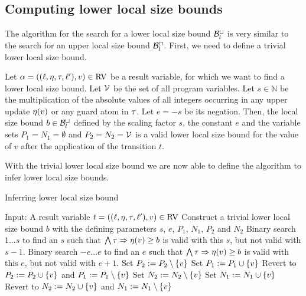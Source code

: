\subsection{Computing lower local size bounds}

The algorithm for the search for a lower local size bound $\mathcal{B}^\sqcup_l$ is very similar to the search for an upper local size bound $\mathcal{B}^\sqcap_l$.
First, we need to define a trivial lower local size bound.

\begin{definition}
  Let $\alpha = ((\ell,\eta,\tau,\ell'),v) \in \text{RV}$ be a result variable, for which we want to find a lower local size bound.
  Let $\mathcal{V}$ be the set of all program variables.
  Let $s \in \mathbb{N}$ be the multiplication of the absolute values of all integers occurring in any upper update $\eta(v)$ or any guard atom in $\tau$.
  Let $e = -s$ be its negation.
  Then, the local size bound $b \in \mathcal{B}^\sqcup_l$ defined by the scaling factor $s$, the constant $e$ and the variable sets $P_1 = N_1 = \emptyset$ and $P_2 = N_2 = \mathcal{V}$ is a valid lower local size bound for the value of $v$ after the application of the transition $t$.
\end{definition}

With the trivial lower local size bound we are now able to define the algorithm to infer lower local size bounds.

\begin{algorithm}
\caption{Inferring lower local size bound}\label{llsb_algorithm}
\begin{algorithmic}[1]
  \State Input: A result variable $t = ((\ell,\eta,\tau,\ell'),v) \in \text{RV}$
  \State Construct a trivial lower local size bound $b$ with the defining parameters $s$, $e$, $P_1$, $N_1$, $P_2$ and $N_2$
  \State Binary search $1 \dots s$ to find an $s$ such that $\bigwedge \tau \Rightarrow \eta(v) \geq b$ is valid with this $s$, but not valid with $s-1$.
  \State Binary search $-e \dots e$ to find an $e$ such that $\bigwedge \tau \Rightarrow \eta(v) \geq b$ is valid with this $e$, but not valid with $e+1$.
    \State Set $P_2 := P_2 \setminus \lbrace v \rbrace$
      \State Set $P_1 := P_1 \cup \lbrace v \rbrace$
        \State Revert to $P_2 := P_2 \cup \lbrace v \rbrace$ and $P_1 := P_1 \setminus \lbrace v \rbrace$
      \EndIf
    \EndIf
    \State Set $N_2 := N_2 \setminus \lbrace v \rbrace$
      \State Set $N_1 := N_1 \cup \lbrace v \rbrace$
        \State Revert to $N_2 := N_2 \cup \lbrace v \rbrace$ and $N_1 := N_1 \setminus \lbrace v \rbrace$
      \EndIf
    \EndIf
  \EndFor
\end{algorithmic}
\end{algorithm}


